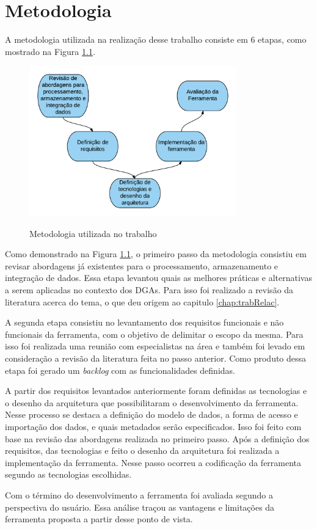 
\chapter{Metodologia}
\label{chap:metodologia}

A metodologia utilizada na realização desse trabalho consiste em 6 etapas, 
como mostrado na Figura \ref{fig:metodologia}.

\begin{figure}[!htb]
    \centering
    \caption{Metodologia utilizada no trabalho}
    \includegraphics[width=0.8\textwidth]{./04-figuras/metodologia}
    \label{fig:metodologia}
\end{figure}


Como demonstrado na Figura \ref{fig:metodologia}, o primeiro passo da metodologia consistiu em revisar abordagens 
já existentes para o processamento, armazenamento e integração de dados. Essa etapa 
levantou quais as melhores práticas e alternativas a serem aplicadas no contexto dos DGAs. 
Para isso foi realizado a revisão da literatura acerca do tema, o que deu origem ao capitulo 
\ref{chap:trabRelac}.

A segunda etapa consistiu no levantamento dos requisitos funcionais e não funcionais da 
ferramenta, com o objetivo de delimitar o escopo da mesma. Para isso foi realizada uma reunião
com especialistas na área e também foi levado em consideração a revisão da literatura 
feita no passo anterior. Como produto dessa etapa foi gerado um \textit{backlog} com as 
funcionalidades definidas.

A partir dos requisitos levantados anteriormente foram definidas as tecnologias e o desenho 
da arquitetura que possibilitaram o desenvolvimento da ferramenta. Nesse processo se destaca 
a definição do modelo de dados, a forma de acesso e importação dos dados, e quais metadados
serão especificados. Isso foi feito com base na revisão das abordagens realizada no primeiro
passo. Após a definição dos requisitos, das tecnologias e feito o desenho da arquitetura 
foi realizada a implementação da ferramenta. Nesse passo ocorreu a codificação da ferramenta
segundo as tecnologias escolhidas. 

Com o término do desenvolvimento a ferramenta foi avaliada segundo a perspectiva do usuário. 
Essa análise traçou as vantagens e limitações da ferramenta proposta a partir desse 
ponto de vista.
